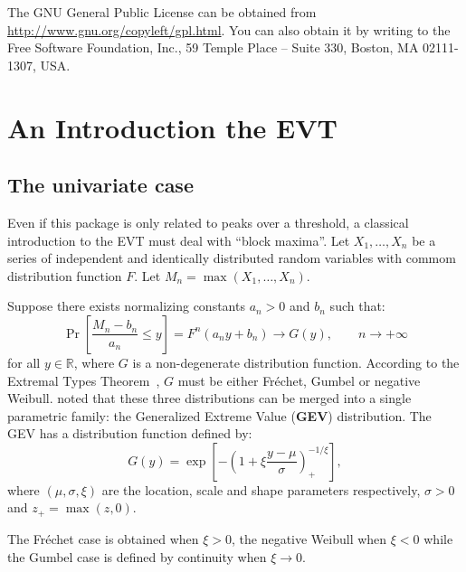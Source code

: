 \documentclass[a4paper]{article}
\numberwithin{equation}{section}
\theoremstyle{definition}
\begin{document}
The GNU General Public License can be obtained from
\url{http://www.gnu.org/copyleft/gpl.html}.  You can also obtain it by
writing to the Free Software Foundation, Inc., 59 Temple Place --
Suite 330, Boston, MA 02111-1307, USA.

\section{An Introduction the EVT}
\label{sec:introEVT}

\subsection{The univariate case}
\label{subsec:univ}

Even if this package is only related to peaks over a threshold, a
classical introduction to the EVT must deal with ``block maxima''. Let
$X_1,\ldots,X_n$ be a series of independent and identically distributed
random variables with commom distribution function $F$. Let $M_n =
\max(X_1,\ldots,X_n)$.

Suppose there exists normalizing constants $a_n>0$ and $b_n$ such
that:
\begin{equation}
  \label{eq:convMax}
  \Pr\left[\frac{M_n - b_n}{a_n} \leq y \right] = F^n(a_ny+b_n)
  \longrightarrow G(y), \qquad n \rightarrow +\infty
\end{equation}
for all $y \in \mathbb{R}$, where $G$ is a non-degenerate distribution
function. According to the Extremal Types Theorem~\citep{Fisher1928},
$G$ must be either Fr\'echet, Gumbel or negative
Weibull. \citet{Jenkinson1955} noted that these three distributions can
be merged into a single parametric family: the Generalized Extreme
Value (\textbf{GEV}) distribution. The GEV has a distribution function
defined by:
\begin{equation}
  \label{eq:GEV}
  G(y) = \exp\left[ -\left( 1 + \xi \frac{y-\mu}{\sigma}
    \right)_+^{-1/\xi} \right],
\end{equation}
where $(\mu,\sigma,\xi)$ are the location, scale and shape parameters
respectively, $\sigma>0$ and $z_+=\max(z,0)$.

The Fr\'echet case is obtained when $\xi>0$, the negative Weibull when
$\xi<0$ while the Gumbel case is defined by continuity when
$\xi\rightarrow0$.
\end{document}
